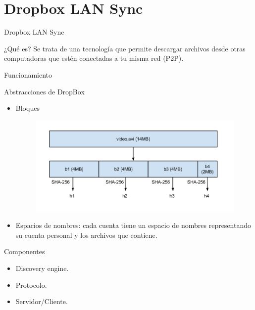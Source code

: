 \documentclass[10pt]{beamer}
\begin{document}
\section{Dropbox LAN Sync}

\begin{frame}{Dropbox LAN Sync}
\begin{alertblock}{¿Qué es?}
	Se trata de una tecnología que  permite descargar archivos desde otras computadoras que estén conectadas a tu misma red (P2P).
\end{alertblock}
\end{frame}

\begin{frame}{Funcionamiento}
\begin{alertblock}{Abstracciones de DropBox}
	\begin{itemize}
		\item Bloques
		\begin{figure}[h]
			\centering
			\includegraphics[width=0.7\linewidth]{bloques}

		\end{figure}
		
		\item Espacios de nombres: cada cuenta tiene un espacio de nombres representando su cuenta personal y los archivos que contiene.
	\end{itemize}
	
\end{alertblock}
\end{frame}

\begin{frame}{Componentes}
\begin{itemize}
	\item Discovery engine.
	\item Protocolo.
	\item Servidor/Cliente.
\end{itemize}
\end{frame}
\end{document}
